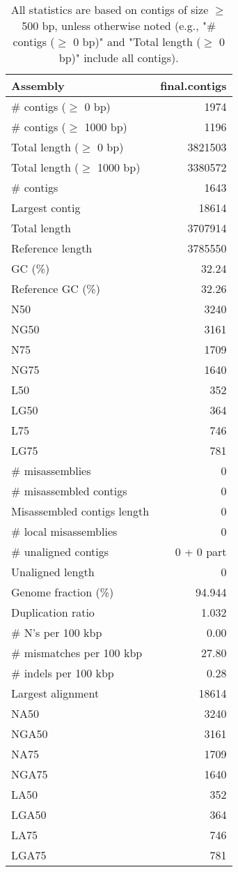 \documentclass[12pt,a4paper]{article}
\begin{document}
\begin{table}[ht]
\begin{center}
\caption{All statistics are based on contigs of size $\geq$ 500 bp, unless otherwise noted (e.g., "\# contigs ($\geq$ 0 bp)" and "Total length ($\geq$ 0 bp)" include all contigs).}
\begin{tabular}{|l*{1}{|r}|}
\hline
Assembly & final.contigs \\ \hline
\# contigs ($\geq$ 0 bp) & 1974 \\ \hline
\# contigs ($\geq$ 1000 bp) & 1196 \\ \hline
Total length ($\geq$ 0 bp) & 3821503 \\ \hline
Total length ($\geq$ 1000 bp) & 3380572 \\ \hline
\# contigs & 1643 \\ \hline
Largest contig & 18614 \\ \hline
Total length & 3707914 \\ \hline
Reference length & 3785550 \\ \hline
GC (\%) & 32.24 \\ \hline
Reference GC (\%) & 32.26 \\ \hline
N50 & 3240 \\ \hline
NG50 & 3161 \\ \hline
N75 & 1709 \\ \hline
NG75 & 1640 \\ \hline
L50 & 352 \\ \hline
LG50 & 364 \\ \hline
L75 & 746 \\ \hline
LG75 & 781 \\ \hline
\# misassemblies & 0 \\ \hline
\# misassembled contigs & 0 \\ \hline
Misassembled contigs length & 0 \\ \hline
\# local misassemblies & 0 \\ \hline
\# unaligned contigs & 0 + 0 part \\ \hline
Unaligned length & 0 \\ \hline
Genome fraction (\%) & 94.944 \\ \hline
Duplication ratio & 1.032 \\ \hline
\# N's per 100 kbp & 0.00 \\ \hline
\# mismatches per 100 kbp & 27.80 \\ \hline
\# indels per 100 kbp & 0.28 \\ \hline
Largest alignment & 18614 \\ \hline
NA50 & 3240 \\ \hline
NGA50 & 3161 \\ \hline
NA75 & 1709 \\ \hline
NGA75 & 1640 \\ \hline
LA50 & 352 \\ \hline
LGA50 & 364 \\ \hline
LA75 & 746 \\ \hline
LGA75 & 781 \\ \hline
\end{tabular}
\end{center}
\end{table}
\end{document}
